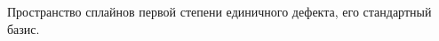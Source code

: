 \documentclass[__main__.tex]{subfiles}
\begin{document}
Пространство сплайнов первой степени единичного дефекта, его стандартный базис.
\end{document}
